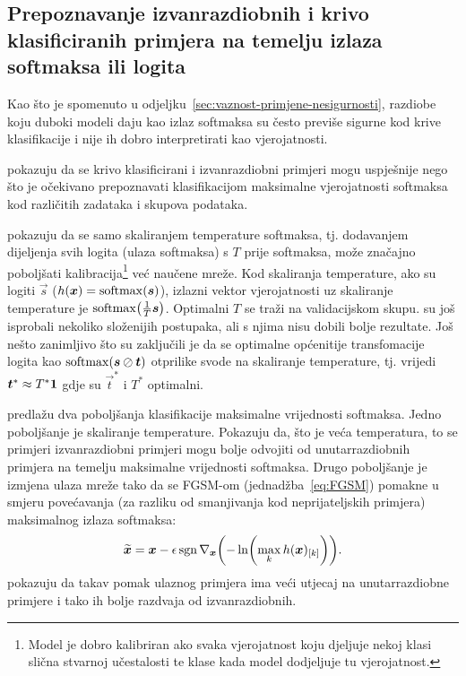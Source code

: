 \documentclass[utf8, diplomski, lmodern]{fer}
\begin{document}
\subsection{Prepoznavanje izvanrazdiobnih i krivo klasificiranih primjera na temelju izlaza softmaksa ili logita} \label{subsec:pristupi-ood-softmaks-logiti}

Kao što je spomenuto u odjeljku~\ref{sec:vaznost-primjene-nesigurnosti}, razdiobe koju duboki modeli daju kao izlaz softmaksa su često previše sigurne kod krive klasifikacije i nije ih dobro interpretirati kao vjerojatnosti.

\cite{Hendrycks:2016:BDMOODE} pokazuju da se krivo klasificirani i izvanrazdiobni primjeri mogu uspješnije nego što je očekivano prepoznavati klasifikacijom maksimalne vjerojatnosti softmaksa kod različitih zadataka i skupova podataka. 

\citet{Guo:2017:CMNN} pokazuju da se samo skaliranjem temperature softmaksa, tj. dodavanjem dijeljenja svih logita (ulaza softmaksa) s $T$ prije softmaksa, može značajno poboljšati kalibracija\footnote{Model je dobro kalibriran ako svaka vjerojatnost koju djeljuje nekoj klasi slična stvarnoj učestalosti te klase kada model dodjeljuje tu vjerojatnost.} već naučene mreže. Kod skaliranja temperature, ako su logiti $\vec s$ ($h(\vec x)=\softmax(\vec s)$), izlazni vektor vjerojatnosti uz skaliranje temperature je $\softmax\del{\frac{1}{T}\vec s}$. Optimalni $T$ se traži na validacijskom skupu. \citet{Guo:2017:CMNN} su još isprobali nekoliko složenijih postupaka, ali s njima nisu dobili bolje rezultate. Još nešto zanimljivo što su zaključili je da se optimalne općenitije transfomacije logita kao $\softmax(\vec s\oslash\vec t)$ otprilike svode na skaliranje temperature, tj. vrijedi $\vec t^*\approx T^*\cvec 1$ gdje su $\vec t^*$ i $T^*$ optimalni. 

\cite{Liang:2017:PDOODENN} predlažu dva poboljšanja klasifikacije maksimalne vrijednosti softmaksa. Jedno poboljšanje je skaliranje temperature. Pokazuju da, što je veća temperatura, to se primjeri izvanrazdiobni primjeri mogu bolje odvojiti od unutarrazdiobnih primjera na temelju maksimalne vrijednosti softmaksa. Drugo poboljšanje je izmjena ulaza mreže tako da se FGSM-om (jednadžba~\eqref{eq:FGSM}) pomakne u smjeru povećavanja (za razliku od smanjivanja kod neprijateljskih primjera) maksimalnog izlaza softmaksa:
\begin{equation} \label{eq:ODIN-FGSM}
\widetilde{\vec x} = \vec x - \epsilon\sgn\nabla_{\vec x}\del{-\ln \del{\max_k h(\vec x)_\ind{k}}} \text{.}
\end{equation}
\cite{Liang:2017:PDOODENN} pokazuju da takav pomak ulaznog primjera ima veći utjecaj na unutarrazdiobne primjere i tako ih bolje razdvaja od izvanrazdiobnih.
 
\end{document}
